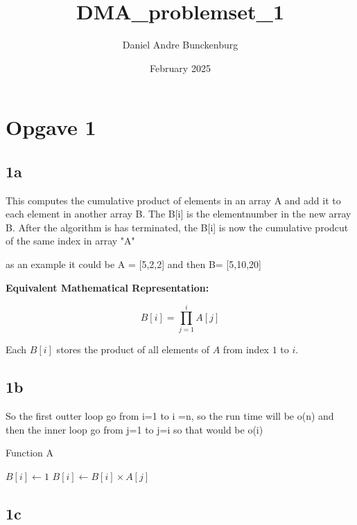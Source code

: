 \documentclass{article}
\title{DMA_problemset_1}
\author{Daniel Andre Bunckenburg}
\date{February 2025}
\begin{document}
\maketitle

\section{Opgave 1}


\subsection{1a}

This computes the cumulative product of elements in an array A and add it to each element in another array B. The B[i] is the elementnumber in the new array B.  After the algorithm is has terminated, the B[i] is now the cumulative prodcut of the same index in array "A"


as an example it could be A = [5,2,2] and then B= [5,10,20]


\textbf{Equivalent Mathematical Representation:}

\[
B[i] = \prod_{j=1}^{i} A[j]
\]

Each \( B[i] \) stores the product of all elements of \( A \) from index \( 1 \) to \( i \).



\subsection{1b}

So the first outter loop go from i=1  to i =n, so the run time will be o(n) and then the inner loop go from j=1 to j=i so that would be o(i) 


\begin{algorithm}
\caption{Function A }
\begin{algorithmic}[1]
 
    \State $B[i] \gets 1$ 
     
        \State $B[i] \gets B[i] \times A[j]$ 
    \EndFor
\EndFor
\end{algorithmic}
\end{algorithm}



\subsection{1c}
\end{document}
